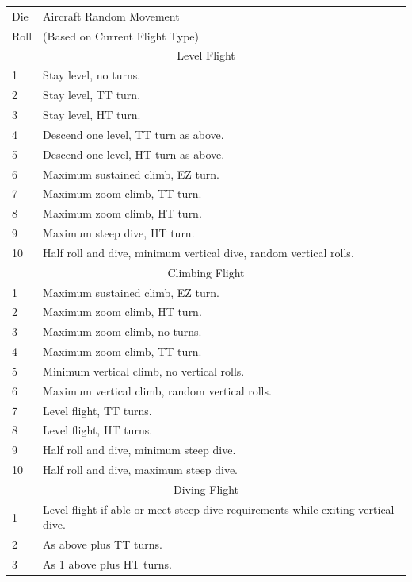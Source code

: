 \begin{onecolumntablefloat}[p]
\begin{onecolumntable}

\small
\begin{tabularx}{\linewidth}{lX}
\toprule
Die&Aircraft Random Movement\\
Roll&(Based on Current Flight Type)\\
\midrule
\multicolumn{2}{c}{Level Flight}\\
\midrule
1   &Stay level, no turns.\\
2   &Stay level, TT turn.\\
3   &Stay level, HT turn.\\
4   &Descend one level, TT turn as above.\\
5   &Descend one level, HT turn as above.\\
6   &Maximum sustained climb, EZ turn.\\
7   &Maximum zoom climb, TT turn.\\
8   &Maximum zoom climb, HT turn.\\
9   &Maximum steep dive, HT turn.\\
10  &Half roll and dive, minimum vertical dive, random vertical rolls.\\
\midrule
\multicolumn{2}{c}{Climbing Flight}\\
\midrule
1   &Maximum sustained climb, EZ turn.\\
2   &Maximum zoom climb, HT turn.\\
3   &Maximum zoom climb, no turns.\\
4   &Maximum zoom climb, TT turn.\\
5   &Minimum vertical climb, no vertical rolls.\\
6   &Maximum vertical climb, random vertical rolls.\\
7   &Level flight, TT turns.\\
8   &Level flight, HT turns.\\
9   &Half roll and dive, minimum steep dive.\\
10  &Half roll and dive, maximum steep dive.\\
\midrule
\multicolumn{2}{c}{Diving Flight}\\
\midrule
1   &Level flight if able or meet steep dive requirements while exiting vertical dive.\\
2   &As above plus TT turns.\\
3   &As 1 above plus HT turns.\\

\end{tabularx}
\end{onecolumntable}
\end{onecolumntablefloat}
